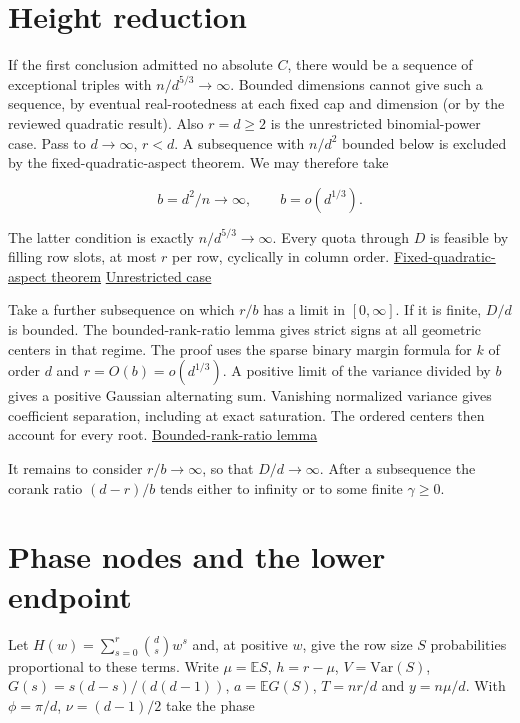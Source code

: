 \section{Height reduction}

If the first conclusion admitted no absolute $C$, there would be a sequence of exceptional triples with $n/d^{5/3}\to\infty$. Bounded dimensions cannot give such a sequence, by eventual real-rootedness at each fixed cap and dimension (or by the reviewed quadratic result). Also $r=d\ge2$ is the unrestricted binomial-power case. Pass to $d\to\infty$, $r<d$. A subsequence with $n/d^2$ bounded below is excluded by the fixed-quadratic-aspect theorem. We may therefore take

\begin{equation*}
b=d^2/n\longrightarrow\infty,\qquad b=o(d^{1/3}).
\end{equation*}

The latter condition is exactly $n/d^{5/3}\to\infty$. Every quota through $D$ is feasible by filling row slots, at most $r$ per row, cyclically in column order. \href{https://github.com/ProgramComputer/open-math-research/tree/605cc467a5be93a8408519da331e46f1008df96e/topics/balanced-arrays/critical-aspect}{Fixed-quadratic-aspect theorem} \enspace \href{https://github.com/ProgramComputer/open-math-research/blob/605cc467a5be93a8408519da331e46f1008df96e/topics/balanced-arrays/finite-linear-reduction.md}{Unrestricted case}

Take a further subsequence on which $r/b$ has a limit in $[0,\infty]$. If it is finite, $D/d$ is bounded. The bounded-rank-ratio lemma gives strict signs at all geometric centers in that regime. The proof uses the sparse binary margin formula for $k$ of order $d$ and $r=O(b)=o(d^{1/3})$. A positive limit of the variance divided by $b$ gives a positive Gaussian alternating sum. Vanishing normalized variance gives coefficient separation, including at exact saturation. The ordered centers then account for every root. \hyperref[sec:small-cap-bounded-degree-ratio]{Bounded-rank-ratio lemma}

It remains to consider $r/b\to\infty$, so that $D/d\to\infty$. After a subsequence the corank ratio $(d-r)/b$ tends either to infinity or to some finite $\gamma\ge0$.

\section{Phase nodes and the lower endpoint}

Let $H(w)=\sum_{s=0}^r\binom ds w^s$ and, at positive $w$, give the row size $S$ probabilities proportional to these terms. Write $\mu=\mathbb ES$, $h=r-\mu$, $V=\mathrm{Var}(S)$, $G(s)=s(d-s)/(d(d-1))$, $a=\mathbb E G(S)$, $T=nr/d$ and $y=n\mu/d$. With $\phi=\pi/d$, $\nu=(d-1)/2$ take the phase

